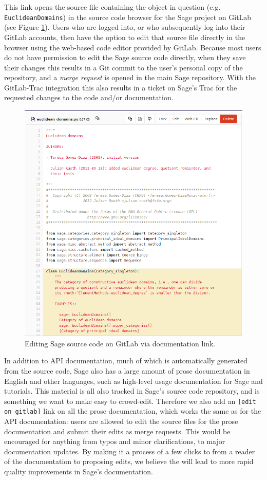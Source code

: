 This link opens the source file containing the object in question (e.g.~{\tt
EuclideanDomains}) in the source code browser for the Sage project on GitLab
(see Figure \ref{fig:edit-on-gitlab}).  Users who are logged into, or who
subsequently log into their GitLab accounts, then have the option to edit that
source file directly in the browser using the web-based code editor provided by
GitLab.  Because most users do not have permission to edit the Sage source code
directly, when they save their changes this results in a Git commit to the
user's personal copy of the repository, and a {\em merge request} is opened in
the main Sage repository.  With the GitLab-Trac integration this also results
in a ticket on Sage's Trac for the requested changes to the code and/or
documentation.

\begin{figure}[!ht]
    \centering
    \includegraphics[width=\textwidth]{screenshots/edit-on-gitlab}
    \caption{Editing Sage source code on GitLab via documentation link.}
    \label{fig:edit-on-gitlab}
\end{figure}

In addition to API documentation, much of which is automatically generated from
the source code, Sage also has a large amount of prose documentation in English
and other languages, such as high-level usage documentation for Sage and
tutorials.  This material is all also tracked in Sage's source code repository,
and is something we want to make easy to crowd-edit.  Therefore we also add an
{\tt [edit on gitlab]} link on all the prose documentation, which works the
same as for the API documentation: users are allowed to edit the source files
for the prose documentation and submit their edits as merge requests.  This
would be encouraged for anything from typos and minor clarifications, to
major documentation updates.  By making it a process of a few clicks to from
a reader of the documentation to proposing edits, we believe the will lead
to more rapid quality improvements in Sage's documentation.


